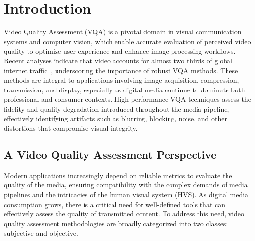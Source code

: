 \chapter{Introduction} \label{chap:intro}

Video Quality Assessment (VQA) is a pivotal domain in visual communication systems and computer vision, which enable accurate evaluation of perceived video quality to optimize user experience and enhance image processing workflows. Recent analyses indicate that video accounts for almost two thirds of global internet traffic~\cite{sandvine_global_2023}, underscoring the importance of robust VQA methods. These methods are integral to applications involving image acquisition, compression, transmission, and display, especially as digital media continue to dominate both professional and consumer contexts. High-performance VQA techniques assess the fidelity and quality degradation introduced throughout the media pipeline, effectively identifying artifacts such as blurring, blocking, noise, and other distortions that compromise visual integrity.

\section{A Video Quality Assessment Perspective} \label{sec:se1}

Modern applications increasingly depend on reliable metrics to evaluate the quality of the media, ensuring compatibility with the complex demands of media pipelines and the intricacies of the human visual system (HVS). As digital media consumption grows, there is a critical need for well-defined tools that can effectively assess the quality of transmitted content. To address this need, video quality assessment methodologies are broadly categorized into two classes: subjective and objective. 

